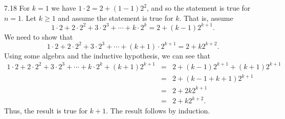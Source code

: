 \begin{Answer}{7.18}
For $k = 1$ we have $1\cdot 2 = 2 + (1-1)2^2$, and so the
statement is true for $n = 1$.
Let $k\geq 1$ and assume the statement is true for
$k$. That is, assume
$$1\cdot 2 + 2\cdot 2^2 + 3\cdot 2^3 + \cdots + k\cdot 2^k = 2 + (k - 1)2^{k + 1}.$$
We need to show that
$$1\cdot 2 + 2\cdot 2^2 + 3\cdot 2^3 + \cdots + (k+1)\cdot 2^{k+1} = 2 + k2^{k + 2}.$$
Using some algebra and the inductive hypothesis, we can see that
\begin{eqnarray*}
1\cdot 2 + 2\cdot 2^2 + 3\cdot 2^3 + \cdots + k\cdot 2^k + (k+1)2^{k+1}
&=& 2 + (k - 1)2^{k + 1} + (k+1)2^{k+1}\\
&=& 2 + (k - 1+k+1)2^{k + 1}\\
& =& 2 + 2k2^{k+1}\\
&=& 2 + k2^{k+2}.
\end{eqnarray*}
Thus, the result is true for $k+1$.  The result follows by induction.
\end{Answer}
